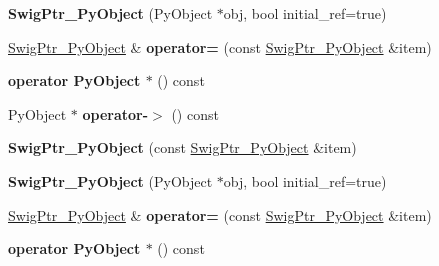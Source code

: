 \begin{DoxyCompactItemize}
\item 
\hypertarget{classswig_1_1SwigPtr__PyObject_a4503d58d577d209f5e1fa67026852505}{
{\bfseries SwigPtr\_\-PyObject} (PyObject $\ast$obj, bool initial\_\-ref=true)}
\label{d2/d50/classswig_1_1SwigPtr__PyObject_a4503d58d577d209f5e1fa67026852505}

\item 
\hypertarget{classswig_1_1SwigPtr__PyObject_a86d8657d6b4a27c8e9e6942bc1ba572c}{
\hyperlink{classswig_1_1SwigPtr__PyObject}{SwigPtr\_\-PyObject} \& {\bfseries operator=} (const \hyperlink{classswig_1_1SwigPtr__PyObject}{SwigPtr\_\-PyObject} \&item)}
\label{d2/d50/classswig_1_1SwigPtr__PyObject_a86d8657d6b4a27c8e9e6942bc1ba572c}

\item 
\hypertarget{classswig_1_1SwigPtr__PyObject_aa2f1cdba0651c7a52482d225faef0574}{
{\bfseries operator PyObject $\ast$} () const }
\label{d2/d50/classswig_1_1SwigPtr__PyObject_aa2f1cdba0651c7a52482d225faef0574}

\item 
\hypertarget{classswig_1_1SwigPtr__PyObject_a97a20cad6a2b0916f39c45555fb559f0}{
PyObject $\ast$ {\bfseries operator-\/$>$} () const }
\label{d2/d50/classswig_1_1SwigPtr__PyObject_a97a20cad6a2b0916f39c45555fb559f0}

\item 
\hypertarget{classswig_1_1SwigPtr__PyObject_a4282f20207f8cd22c9b079203c832a04}{
{\bfseries SwigPtr\_\-PyObject} (const \hyperlink{classswig_1_1SwigPtr__PyObject}{SwigPtr\_\-PyObject} \&item)}
\label{d2/d50/classswig_1_1SwigPtr__PyObject_a4282f20207f8cd22c9b079203c832a04}

\item 
\hypertarget{classswig_1_1SwigPtr__PyObject_a4503d58d577d209f5e1fa67026852505}{
{\bfseries SwigPtr\_\-PyObject} (PyObject $\ast$obj, bool initial\_\-ref=true)}
\label{d2/d50/classswig_1_1SwigPtr__PyObject_a4503d58d577d209f5e1fa67026852505}

\item 
\hypertarget{classswig_1_1SwigPtr__PyObject_a86d8657d6b4a27c8e9e6942bc1ba572c}{
\hyperlink{classswig_1_1SwigPtr__PyObject}{SwigPtr\_\-PyObject} \& {\bfseries operator=} (const \hyperlink{classswig_1_1SwigPtr__PyObject}{SwigPtr\_\-PyObject} \&item)}
\label{d2/d50/classswig_1_1SwigPtr__PyObject_a86d8657d6b4a27c8e9e6942bc1ba572c}

\item 
\hypertarget{classswig_1_1SwigPtr__PyObject_aa2f1cdba0651c7a52482d225faef0574}{
{\bfseries operator PyObject $\ast$} () const }
\label{d2/d50/classswig_1_1SwigPtr__PyObject_aa2f1cdba0651c7a52482d225faef0574}


\end{DoxyCompactItemize}
